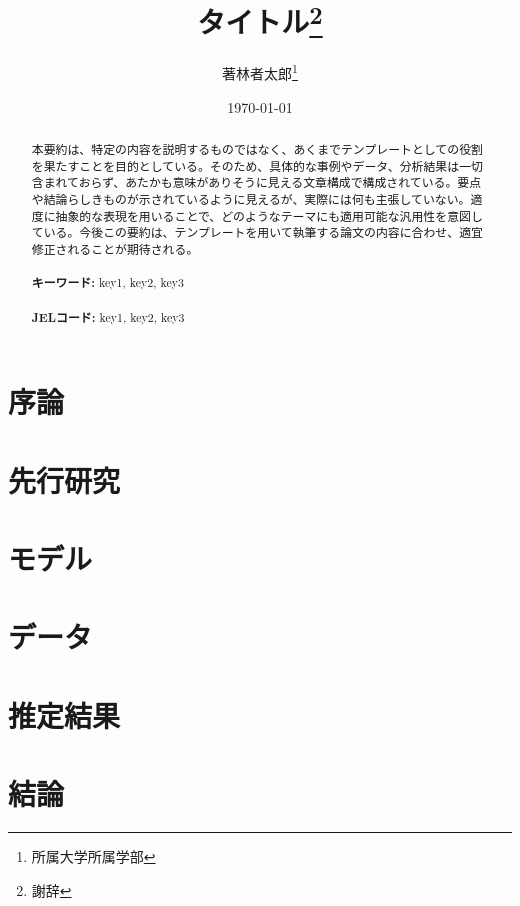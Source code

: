 \documentclass[12pt,a4paper]{ltjarticle}
\begin{document}
\begin{titlepage}
\title{タイトル\thanks{謝辞}}
\author{著林者太郎\thanks{所属大学所属学部}}
\date{\today}
\maketitle
\begin{abstract}
 本要約は、特定の内容を説明するものではなく、あくまでテンプレートとしての役割を果たすことを目的としている。そのため、具体的な事例やデータ、分析結果は一切含まれておらず、あたかも意味がありそうに見える文章構成で構成されている。要点や結論らしきものが示されているように見えるが、実際には何も主張していない。適度に抽象的な表現を用いることで、どのようなテーマにも適用可能な汎用性を意図している。今後この要約は、テンプレートを用いて執筆する論文の内容に合わせ、適宜修正されることが期待される。\\
\vspace{0in}\\
\noindent\textbf{キーワード:} key1, key2, key3\\
\vspace{0in}\\
\noindent\textbf{JELコード:} key1, key2, key3\\

\bigskip
\end{abstract}
\setcounter{page}{0}
\thispagestyle{empty}
\end{titlepage}
\pagebreak \newpage

\section{序論}

\section{先行研究}

\section{モデル}

\section{データ}

\section{推定結果}

\section{結論}




\end{document}
